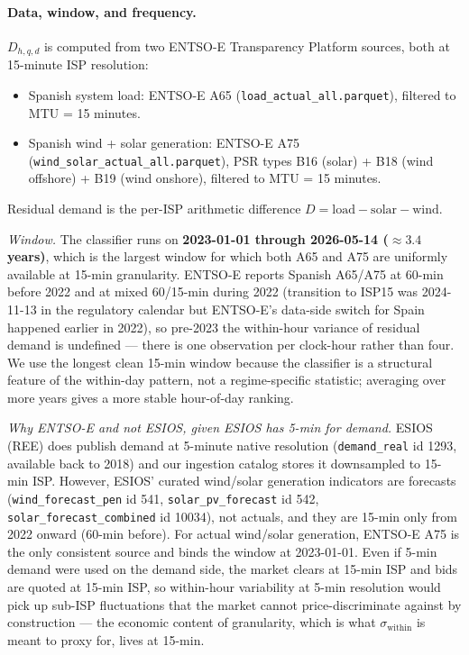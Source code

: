 \documentclass[11pt,a4paper]{article}
\newcommand{\code}[1]{\nolinkurl{#1}}
\begin{document}
\paragraph{Data, window, and frequency.}
$D_{h,q,d}$ is computed from two ENTSO-E Transparency Platform sources, both at 15-minute ISP resolution:
\begin{itemize}
\item Spanish system load: ENTSO-E A65 (\code{load_actual_all.parquet}), filtered to MTU = 15 minutes.
\item Spanish wind + solar generation: ENTSO-E A75 (\code{wind_solar_actual_all.parquet}), PSR types B16 (solar) + B18 (wind offshore) + B19 (wind onshore), filtered to MTU = 15 minutes.
\end{itemize}
Residual demand is the per-ISP arithmetic difference $D = \text{load} - \text{solar} - \text{wind}$.

\emph{Window.} The classifier runs on \textbf{2023-01-01 through 2026-05-14 ($\approx 3.4$ years)}, which is the largest window for which both A65 and A75 are uniformly available at 15-min granularity. ENTSO-E reports Spanish A65/A75 at 60-min before 2022 and at mixed 60/15-min during 2022 (transition to ISP15 was 2024-11-13 in the regulatory calendar but ENTSO-E's data-side switch for Spain happened earlier in 2022), so pre-2023 the within-hour variance of residual demand is undefined --- there is one observation per clock-hour rather than four. We use the longest clean 15-min window because the classifier is a structural feature of the within-day pattern, not a regime-specific statistic; averaging over more years gives a more stable hour-of-day ranking.

\emph{Why ENTSO-E and not ESIOS, given ESIOS has 5-min for demand.} ESIOS (REE) does publish demand at 5-minute native resolution (\code{demand_real} id 1293, available back to 2018) and our ingestion catalog stores it downsampled to 15-min ISP. However, ESIOS' curated wind/solar generation indicators are forecasts (\code{wind_forecast_pen} id 541, \code{solar_pv_forecast} id 542, \code{solar_forecast_combined} id 10034), not actuals, and they are 15-min only from 2022 onward (60-min before). For actual wind/solar generation, ENTSO-E A75 is the only consistent source and binds the window at 2023-01-01. Even if 5-min demand were used on the demand side, the market clears at 15-min ISP and bids are quoted at 15-min ISP, so within-hour variability at 5-min resolution would pick up sub-ISP fluctuations that the market cannot price-discriminate against by construction --- the economic content of granularity, which is what $\sigma_{\text{within}}$ is meant to proxy for, lives at 15-min.
\end{document}
